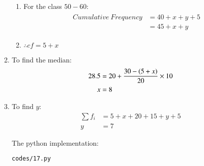 \begin{enumerate}
\begin{enumerate}
\item For the class $50-60$:
\begin{align*}
\begin{split}
Cumulative\ Frequency &= 40 + x + y + 5 \\
&= 45 + x + y
\end{split}
\end{align*}

\item $\therefore cf = 5 + x $
\end{enumerate}

\item To find the median:
\begin{align*}
28.5 &= 20 + \frac{30 - \left(5 + x\right)}{20} \times 10\\
x &= 8
\end{align*}

\item To find $y$:
\begin{align}
\sum f_i &= 5 + x + 20 + 15 + y + 5\\
y &= 7
\end{align}

The python implementation:
\begin{lstlisting}
codes/17.py
\end{lstlisting}

\end{enumerate}
